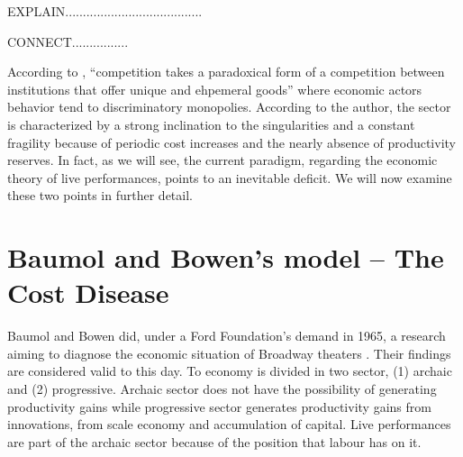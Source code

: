 \documentclass[a4paper, 12pt, openright, oneside, german, french, brazil, english]{abntex2}
\begin{document}
        EXPLAIN.......................................
        


        CONNECT................

        According to , ``competition takes a paradoxical form of a competition between institutions that offer unique and ehpemeral goods'' where economic actors behavior tend to discriminatory monopolies. According to the author, the sector is characterized by a strong inclination to the singularities and a constant fragility because of periodic cost increases and the nearly absence of productivity reserves. In fact, as we will see, the current paradigm, regarding the economic theory of live performances, points to an inevitable deficit. We will now examine these two points in further detail.


        

	
	\section{Baumol and Bowen's model -- The Cost Disease}
	

	Baumol and Bowen did, under a Ford Foundation's demand in 1965, a research aiming to diagnose the economic situation of Broadway theaters \cite{benhamou2007economia}. Their findings are considered valid to this day. To  economy is divided in two sector, (1) archaic and (2) progressive. Archaic sector does not have the possibility of generating productivity gains while progressive sector generates productivity gains from innovations, from scale economy and accumulation of capital. Live performances are part of the archaic sector because of the position that labour has on it.
\end{document}
